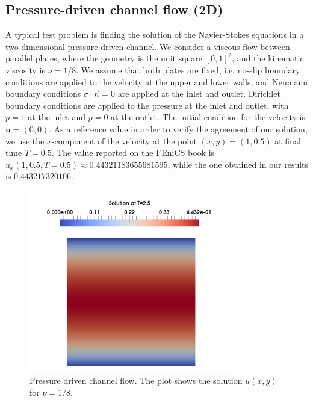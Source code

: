 \documentclass[a4paper,11pt,oneside]{book}
\begin{document}
\subsection{Pressure-driven channel flow (2D)}


A typical test problem is finding the solution of the Navier-Stokes equations in a two-dimensional pressure-driven channel. We consider a viscous flow between parallel plates, where the geometry is the unit square $[0,1]^2$, and the kinematic viscosity is $\nu = 1/8$. We assume that both plates are fixed, i.e. no-slip boundary conditions are applied to the velocity at the upper and lower walls, and Neumann boundary conditions $\sigma \cdot \vec{n} = 0$ are applied at the inlet and outlet. Dirichlet boundary conditions are applied to the pressure at the inlet and outlet, with $p = 1$ at the inlet and $p = 0$ at the outlet. The initial condition for the velocity is $\mathbf{u} = (0,0)$. As a reference value in order to verify the agreement of our solution, we use the $x$-component of the velocity at the point $(x, y) = (1, 0.5)$ at final time $T = 0.5 $. The value reported on the FEniCS book \cite{logg} is $u_x(1, 0.5, T=0.5) \approx 0.44321183655681595$, while the one obtained in our results is $0.443217320106$.

\begin{figure}[h!]
\centering
\includegraphics[width=0.8\textwidth]{images/velocity_solution.png}
\caption{Pressure driven channel flow. The plot shows the solution $u(x,y)$ for $\nu = 1/8$.}
\end{figure}
\end{document}
